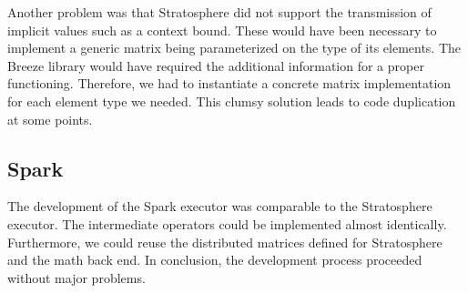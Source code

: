 Another problem was that Stratosphere did not support the transmission of implicit values such as a context bound.
These would have been necessary to implement a generic matrix being parameterized on the type of its elements.
The Breeze library would have required the additional information for a proper functioning.
Therefore, we had to instantiate a concrete matrix implementation for each element type we needed.
This clumsy solution leads to code duplication at some points.

\subsection{Spark}

The development of the Spark executor was comparable to the Stratosphere executor.
The intermediate operators could be implemented almost identically.
Furthermore, we could reuse the distributed matrices defined for Stratosphere and the math back end.
In conclusion, the development process proceeded without major problems. 
